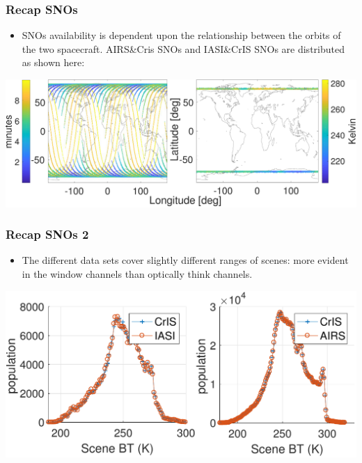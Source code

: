 \documentclass[10pt,t]{beamer}
\begin{document}
\begin{frame}
  \frametitle{Recap SNOs}
  \begin{itemize}
  \item SNOs availability is dependent upon the relationship between the orbits of the two spacecraft. AIRS\&Cris SNOs and IASI\&CrIS SNOs are distributed as shown here:
  \end{itemize}

  \begin{center}
  \includegraphics[width=\linewidth]{./Figs/Pdf/fig3_resize.pdf}
  \end{center}

\end{frame}

\begin{frame}
  \frametitle{Recap SNOs 2}
  \begin{itemize}
  \item The different data sets cover slightly different ranges of scenes: more evident in the window channels than optically think channels.
  \end{itemize}

  \begin{center}
    \includegraphics[width=\linewidth]{./Figs/Pdf/fig4_resize.pdf}
  \end{center}

\end{frame}
\end{document}
